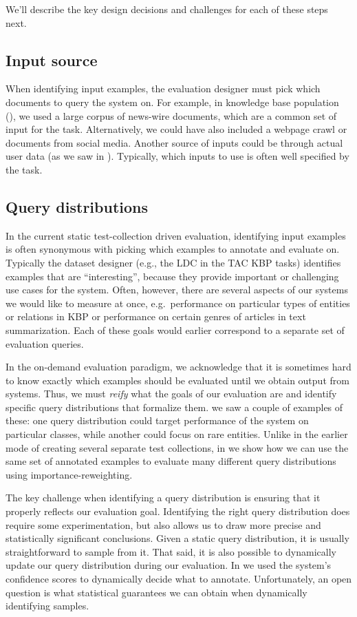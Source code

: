 We'll describe the key design decisions and challenges for each of these steps next.

\subsection{Input source}
When identifying input examples, the evaluation designer must pick which documents to query the system on.
For example, in knowledge base population (), we used a large corpus of news-wire documents, which are a common set of input for the task.
Alternatively, we could have also included a webpage crawl or documents from social media.
Another source of inputs could be through actual user data (as we saw in ).
Typically, which inputs to use is often well specified by the task.

\subsection{Query distributions}
In the current static test-collection driven evaluation, identifying input examples is often synonymous with picking which examples to annotate and evaluate on.
Typically the dataset designer (e.g., the LDC in the TAC KBP tasks) identifies examples that are ``interesting'', because they provide important or challenging use cases for the system.
Often, however, there are several aspects of our systems we would like to measure at once, e.g.\ performance on particular types of entities or relations in KBP or performance on certain genres of articles in text summarization.
Each of these goals would earlier correspond to a separate set of evaluation queries. 

In the on-demand evaluation paradigm, 
  we acknowledge that it is sometimes hard to know exactly which examples should be evaluated until we obtain output from systems.
Thus, we must \textit{reify} what the goals of our evaluation are and identify specific query distributions that formalize them.
 we saw a couple of examples of these: one query distribution could target performance of the system on particular classes, while another could focus on rare entities.
Unlike in the earlier mode of creating several separate test collections, in  we show how we can use the same set of annotated examples to evaluate many different query distributions using importance-reweighting.

The key challenge when identifying a query distribution is ensuring that it properly reflects our evaluation goal.
Identifying the right query distribution does require some experimentation, but also allows us to draw more precise and statistically significant conclusions.
Given a static query distribution, it is usually straightforward to sample from it.
That said, it is also possible to dynamically update our query distribution during our evaluation.
In  we used the system's confidence scores to dynamically decide what to annotate.
Unfortunately, an open question is what statistical guarantees we can obtain when dynamically identifying samples.


